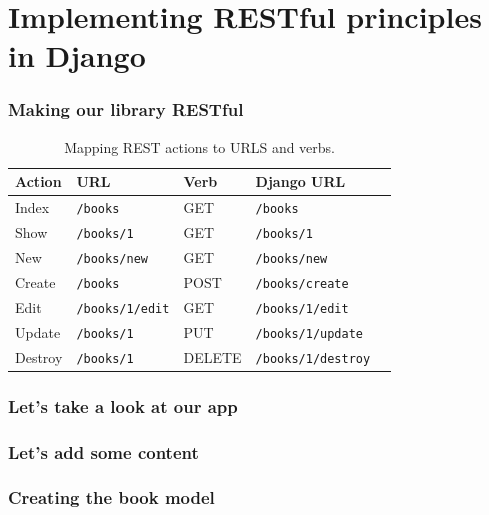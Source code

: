 \documentclass[10pt,t,xcolor=dvipsnames]{beamer}
\begin{document}
\section{Implementing RESTful principles in Django}
\begin{frame}[fragile]
\frametitle{Making our library RESTful}
\pause
\begin{table}
\scriptsize
\centering
\begin{tabular}{|l|l|l|l|l|}\hline
\textbf{Action}  &\textbf{URL}&  \textbf{Verb} & \textbf{Django URL} \\ \hline\hline
Index&    \texttt{/books}&         GET &     \texttt{/books}\\
Show&     \texttt{/books/1}&       GET &     \texttt{/books/1}\\
New&      \texttt{/books/new}&     GET &     \texttt{/books/new}\\
Create&   \texttt{/books}&         POST &    \texttt{/books/create} \\
Edit&     \texttt{/books/1/edit}&  GET &     \texttt{/books/1/edit}\\
Update&   \texttt{/books/1}&       PUT &     \texttt{/books/1/update}\\
Destroy&  \texttt{/books/1}&       DELETE &  \texttt{/books/1/destroy}\\ \hline
\end{tabular}
\caption{\footnotesize Mapping REST actions to URLS and verbs.}
\end{table}

\end{frame}
\begin{frame}[fragile]
\frametitle{Let's take a look at our app}

\end{frame}
\begin{frame}[fragile]
\frametitle{Let's add some content}

\end{frame}
\begin{frame}[fragile]
\frametitle{Creating the book model}

\end{frame}
\end{document}
